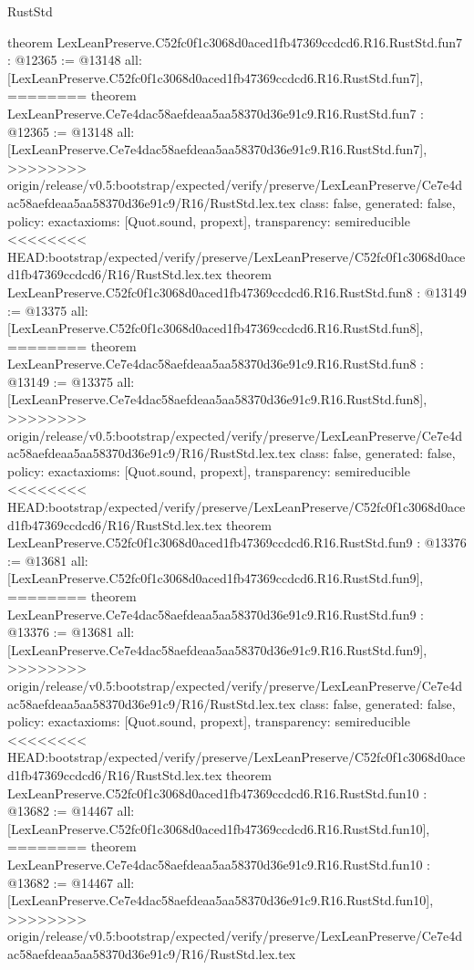 \begin{lexlean}{RustStd}
\begin{coremodule}
{\begin{coremodule}
{{{{{{{{{theorem LexLeanPreserve.C52fc0f1c3068d0aced1fb47369ccdcd6.R16.RustStd.fun7 : @12365 := @13148 {
  all: [LexLeanPreserve.C52fc0f1c3068d0aced1fb47369ccdcd6.R16.RustStd.fun7],
========
theorem LexLeanPreserve.Ce7e4dac58aefdeaa5aa58370d36e91c9.R16.RustStd.fun7 : @12365 := @13148 {
  all: [LexLeanPreserve.Ce7e4dac58aefdeaa5aa58370d36e91c9.R16.RustStd.fun7],
>>>>>>>> origin/release/v0.5:bootstrap/expected/verify/preserve/LexLeanPreserve/Ce7e4dac58aefdeaa5aa58370d36e91c9/R16/RustStd.lex.tex
  class: false,
  generated: false,
  policy: exact{axioms: [Quot.sound, propext]},
  transparency: semireducible
}
<<<<<<<< HEAD:bootstrap/expected/verify/preserve/LexLeanPreserve/C52fc0f1c3068d0aced1fb47369ccdcd6/R16/RustStd.lex.tex
theorem LexLeanPreserve.C52fc0f1c3068d0aced1fb47369ccdcd6.R16.RustStd.fun8 : @13149 := @13375 {
  all: [LexLeanPreserve.C52fc0f1c3068d0aced1fb47369ccdcd6.R16.RustStd.fun8],
========
theorem LexLeanPreserve.Ce7e4dac58aefdeaa5aa58370d36e91c9.R16.RustStd.fun8 : @13149 := @13375 {
  all: [LexLeanPreserve.Ce7e4dac58aefdeaa5aa58370d36e91c9.R16.RustStd.fun8],
>>>>>>>> origin/release/v0.5:bootstrap/expected/verify/preserve/LexLeanPreserve/Ce7e4dac58aefdeaa5aa58370d36e91c9/R16/RustStd.lex.tex
  class: false,
  generated: false,
  policy: exact{axioms: [Quot.sound, propext]},
  transparency: semireducible
}
<<<<<<<< HEAD:bootstrap/expected/verify/preserve/LexLeanPreserve/C52fc0f1c3068d0aced1fb47369ccdcd6/R16/RustStd.lex.tex
theorem LexLeanPreserve.C52fc0f1c3068d0aced1fb47369ccdcd6.R16.RustStd.fun9 : @13376 := @13681 {
  all: [LexLeanPreserve.C52fc0f1c3068d0aced1fb47369ccdcd6.R16.RustStd.fun9],
========
theorem LexLeanPreserve.Ce7e4dac58aefdeaa5aa58370d36e91c9.R16.RustStd.fun9 : @13376 := @13681 {
  all: [LexLeanPreserve.Ce7e4dac58aefdeaa5aa58370d36e91c9.R16.RustStd.fun9],
>>>>>>>> origin/release/v0.5:bootstrap/expected/verify/preserve/LexLeanPreserve/Ce7e4dac58aefdeaa5aa58370d36e91c9/R16/RustStd.lex.tex
  class: false,
  generated: false,
  policy: exact{axioms: [Quot.sound, propext]},
  transparency: semireducible
}
<<<<<<<< HEAD:bootstrap/expected/verify/preserve/LexLeanPreserve/C52fc0f1c3068d0aced1fb47369ccdcd6/R16/RustStd.lex.tex
theorem LexLeanPreserve.C52fc0f1c3068d0aced1fb47369ccdcd6.R16.RustStd.fun10 : @13682 := @14467 {
  all: [LexLeanPreserve.C52fc0f1c3068d0aced1fb47369ccdcd6.R16.RustStd.fun10],
========
theorem LexLeanPreserve.Ce7e4dac58aefdeaa5aa58370d36e91c9.R16.RustStd.fun10 : @13682 := @14467 {
  all: [LexLeanPreserve.Ce7e4dac58aefdeaa5aa58370d36e91c9.R16.RustStd.fun10],
>>>>>>>> origin/release/v0.5:bootstrap/expected/verify/preserve/LexLeanPreserve/Ce7e4dac58aefdeaa5aa58370d36e91c9/R16/RustStd.lex.tex
}}}}}}}}}}}}}}
\end{coremodule}}
\end{coremodule}
\end{lexlean}
